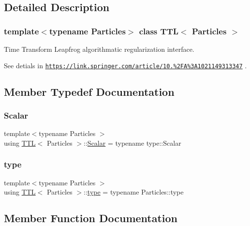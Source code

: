 \subsection{Detailed Description}
\subsubsection*{template$<$typename Particles$>$\newline
class T\+T\+L$<$ Particles $>$}

Time Transform Leapfrog algorithmatic regularization interface. 

See detials in \href{https://link.springer.com/article/10.1023%2FA%3A1021149313347}{\tt https\+://link.\+springer.\+com/article/10.\+1023\%2\+F\+A\%3\+A1021149313347} . 

\subsection{Member Typedef Documentation}
\mbox{\label{class_t_t_l_a8d541e387362cebeb59841d22d78f2b4}} 
\subsubsection{\texorpdfstring{Scalar}{Scalar}}
{\footnotesize\ttfamily template$<$typename Particles $>$ \\
using \mbox{\hyperlink{class_t_t_l}{T\+TL}}$<$ Particles $>$\+::\mbox{\hyperlink{class_t_t_l_a8d541e387362cebeb59841d22d78f2b4}{Scalar}} =  typename type\+::\+Scalar}

\mbox{\label{class_t_t_l_af4afef1cacfe12873d9d97ca04d66d11}} 
\subsubsection{\texorpdfstring{type}{type}}
{\footnotesize\ttfamily template$<$typename Particles $>$ \\
using \mbox{\hyperlink{class_t_t_l}{T\+TL}}$<$ Particles $>$\+::\mbox{\hyperlink{class_t_t_l_af4afef1cacfe12873d9d97ca04d66d11}{type}} =  typename Particles\+::type}



\subsection{Member Function Documentation}
\mbox{\label{class_t_t_l_a0b0f528b376e0ddffef5e7847562ac37}} 
